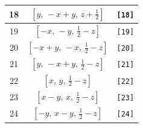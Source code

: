 \documentclass[fleqn,8pt]{jsarticle}
\begin{document}
\begin{longtable}{ccc}
18 & $\left[ y,\, - x + y,\, z + \frac{1}{2} \right]$ & {\tt [18]} \\ \hline
19 & $\left[ - x,\, - y,\, \frac{1}{2} - z \right]$ & {\tt [19]} \\ \hline
20 & $\left[ - x + y,\, - x,\, \frac{1}{2} - z \right]$ & {\tt [20]} \\ \hline
21 & $\left[ y,\, - x + y,\, \frac{1}{2} - z \right]$ & {\tt [21]} \\ \hline
22 & $\left[ x,\, y,\, \frac{1}{2} - z \right]$ & {\tt [22]} \\ \hline
23 & $\left[ x - y,\, x,\, \frac{1}{2} - z \right]$ & {\tt [23]} \\ \hline
24 & $\left[ - y,\, x - y,\, \frac{1}{2} - z \right]$ & {\tt [24]} \\
\end{longtable}
\end{document}
